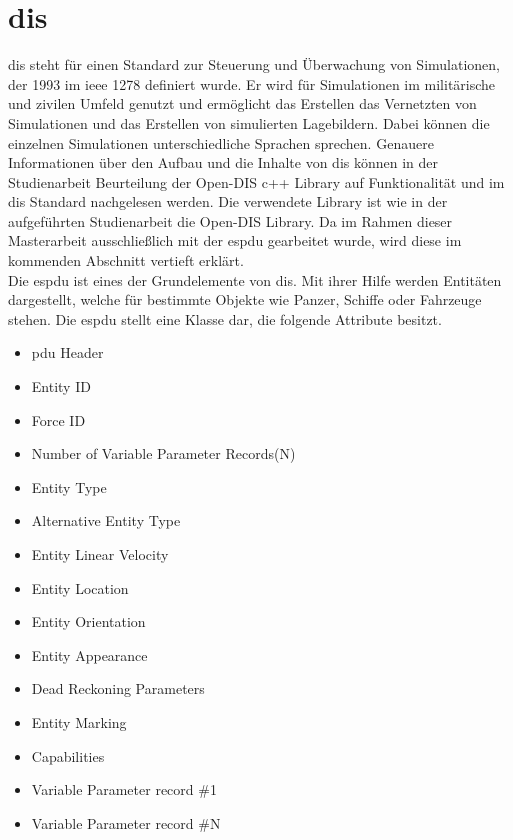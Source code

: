\section{\acl{dis}}
\acf{dis} steht für einen Standard zur Steuerung und Überwachung  von Simulationen, der 1993 im \ac{ieee} 1278 definiert wurde. Er wird für Simulationen im militärische und zivilen Umfeld genutzt und ermöglicht das Erstellen das Vernetzten von Simulationen  und das Erstellen von simulierten Lagebildern. Dabei können die einzelnen Simulationen unterschiedliche Sprachen sprechen. Genauere Informationen über den Aufbau und die Inhalte von \ac{dis} können in der Studienarbeit \glqq Beurteilung der Open-DIS c++ Library auf Funktionalität\grqq{} und im \ac{dis} Standard nachgelesen werden. Die verwendete Library ist wie in der aufgeführten Studienarbeit die  \glqq Open-DIS\grqq{} Library. Da im Rahmen dieser Masterarbeit ausschließlich mit der \acf{espdu} gearbeitet wurde, wird diese im kommenden Abschnitt vertieft erklärt.\\
Die \ac{espdu} ist eines der Grundelemente von \ac{dis}. Mit ihrer Hilfe werden Entitäten dargestellt, welche für bestimmte Objekte wie Panzer, Schiffe oder Fahrzeuge stehen. Die \ac{espdu} stellt eine Klasse dar, die folgende Attribute besitzt.
\begin{itemize}
	\singlespacing
	\item \ac{pdu} Header
	\item Entity ID
	\item Force ID
	\item Number of Variable Parameter Records(N)
	\item Entity Type
	\item Alternative Entity Type
	\item Entity Linear Velocity
	\item Entity Location
	\item Entity Orientation
	\item Entity Appearance
	\item Dead Reckoning Parameters
	\item Entity Marking
	\item Capabilities
	\item Variable Parameter record \#1
	\item Variable Parameter record \#N
\end{itemize} 


